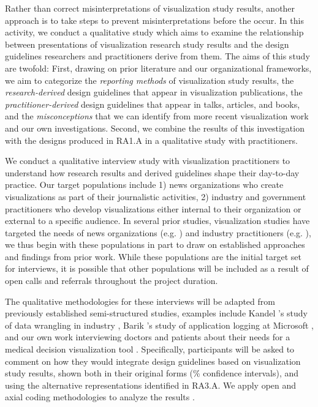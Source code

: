 \documentclass[11pt]{article}
\begin{document}
Rather than correct misinterpretations of visualization study results, another approach is to take steps to prevent misinterpretations before the occur.
In this activity, we conduct a qualitative study which aims to examine the relationship between presentations of visualization research study results and the design guidelines researchers and practitioners derive from them.
The aims of this study are twofold:
First, drawing on prior literature and our organizational frameworks, we aim to categorize the \emph{reporting methods} of visualization study results, the \emph{research-derived} design guidelines that appear in visualization publications, the \emph{practitioner-derived} design guidelines that appear in talks, articles, and books, and the \emph{misconceptions} that we can identify from more recent visualization work and our own investigations.
Second, we combine the results of this investigation with the designs produced in RA1.A in a qualitative study with practitioners.

We conduct a qualitative interview study with visualization practitioners to understand how research results and derived guidelines shape their day-to-day practice.
Our target populations include 1) news organizations who create  visualizations as part of their journalistic activities, 2) industry and government practitioners who develop visualizations either internal to their organization or external to a specific audience. In several prior studies, visualization studies have targeted the needs of news organizations (e.g. \cite{boy2015storytelling, kosara2013storytelling}) and industry practitioners (e.g. \cite{kandel2012enterprise, barik2016bones}), we thus begin with these populations in part to draw on established approaches and findings from prior work.
While these populations are the initial target set for interviews, it is possible that other populations will be included as a result of open calls and referrals throughout the project duration.

The qualitative methodologies for these interviews will be adapted from previously established semi-structured studies, examples include Kandel \etal's study of data wrangling in industry \cite{kandel2012enterprise}, Barik \etal's study of application logging at Microsoft \cite{barik2016bones}, and our own work interviewing doctors and patients about their needs for a medical decision visualization tool \cite{hakone2017proact}.
Specifically, participants will be asked to comment on how they would integrate design guidelines based on visualization study results, shown both in their original forms (\% confidence intervals), and using the alternative representations identified in RA3.A.
We apply open and axial coding methodologies to analyze the results \cite{kandel2012enterprise, barik2016bones, hakone2017proact, yi2007toward, chul2011visual, lam2012empirical}.
\end{document}

